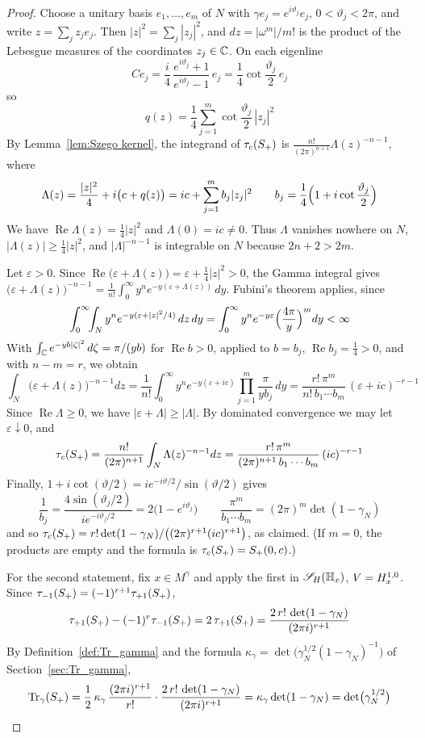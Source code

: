 \documentclass[11pt]{amsart}
\theoremstyle{plain}
\theoremstyle{definition}
\theoremstyle{remark}
\begin{document}
\begin{proof}
Choose a unitary basis $e_1,\dots,e_m$ of $N$ with $\gamma e_j=e^{i\vartheta_j}e_j$, $0<\vartheta_j<2\pi$, and write $z=\sum_j z_je_j$.
Then $|z|^2=\sum_j|z_j|^2$, and $dz=|\omega^m|/m!$ is the product of the Lebesgue measures of the coordinates $z_j\in{\mathbb{C}}$.
On each eigenline
\[ C e_j=\frac{i}{4}\,\frac{e^{i\vartheta_j}+1}{e^{i\vartheta_j}-1}\,e_j=\frac14\cot\frac{\vartheta_j}{2}\,e_j\]
so
\[ q(z)=\frac14\sum_{j=1}^m\cot\frac{\vartheta_j}{2}\,|z_j|^2\]
By Lemma~\ref{lem:Szego kernel}, the integrand of $\tau_{c}(S_+)$ is $\frac{n!}{(2\pi)^{n+1}}\Lambda(z)^{-n-1}$, where
\[ \Lambda(z)=\frac{|z|^2}{4}+i\bigl(c+q(z)\bigr)=ic+\sum_{j=1}^mb_j|z_j|^2\qquad b_j=\frac14\Bigl(1+i\cot\frac{\vartheta_j}{2}\Bigr)\]
We have $\operatorname{Re}\Lambda(z)=\frac14|z|^2$ and $\Lambda(0)=ic\ne0$.
Thus $\Lambda$ vanishes nowhere on $N$, $|\Lambda(z)|\ge\frac14|z|^2$, and $|\Lambda|^{-n-1}$ is integrable on $N$ because $2n+2>2m$.

Let $\varepsilon>0$.
Since $\operatorname{Re}\bigl(\varepsilon+\Lambda(z)\bigr)=\varepsilon+\frac14|z|^2>0$, the Gamma integral gives $\bigl(\varepsilon+\Lambda(z)\bigr)^{-n-1}=\frac1{n!}\int_0^\infty y^ne^{-y(\varepsilon+\Lambda(z))}\,dy$.
Fubini's theorem applies, since
\[ \int_0^\infty\!\!\int_Ny^ne^{-y(\varepsilon+|z|^2/4)}\,dz\,dy=\int_0^\infty y^ne^{-y\varepsilon}\Bigl(\frac{4\pi}{y}\Bigr)^m dy<\infty\]
With $\int_{\mathbb{C}} e^{-yb|\zeta|^2}\,d\zeta=\pi/(yb)$ for $\operatorname{Re}b>0$, applied to $b=b_j$, $\operatorname{Re}b_j=\frac14>0$, and with $n-m=r$, we obtain
\[ \int_N\bigl(\varepsilon+\Lambda(z)\bigr)^{-n-1}dz=\frac{1}{n!}\int_0^\infty y^ne^{-y(\varepsilon+ic)}\prod_{j=1}^m\frac{\pi}{y b_j}\,dy=\frac{r!\,\pi^m}{n!\,b_1\cdots b_m}\,(\varepsilon+ic)^{-r-1}\]
Since $\operatorname{Re}\Lambda\ge0$, we have $|\varepsilon+\Lambda|\ge|\Lambda|$.
By dominated convergence we may let $\varepsilon\downarrow0$, and
\[ \tau_{c}(S_+)=\frac{n!}{(2\pi)^{n+1}}\int_N\Lambda(z)^{-n-1}dz=\frac{r!\,\pi^m}{(2\pi)^{n+1}\,b_1\cdots b_m}\,(ic)^{-r-1}\]
Finally, $1+i\cot(\vartheta/2)=ie^{-i\vartheta/2}/\sin(\vartheta/2)$ gives
\[ \frac{1}{b_j}=\frac{4\sin(\vartheta_j/2)}{ie^{-i\vartheta_j/2}}=2\bigl(1-e^{i\vartheta_j}\bigr)\qquad \frac{\pi^m}{b_1\cdots b_m}=(2\pi)^m\det(1-\gamma_N)\]
and so $\tau_{c}(S_+)=r!\det(1-\gamma_N)/\bigl((2\pi)^{r+1}(ic)^{r+1}\bigr)$, as claimed.
(If $m=0$, the products are empty and the formula is $\tau_{c}(S_+)=S_+(0,c)$.)

For the second statement, fix $x\in M^\gamma$ and apply the first in ${\mathscr{S}_H}(\mathbb{H}_x)$, $V=H^{1,0}_x$.
Since $\tau_{-1}(S_+)=(-1)^{r+1}\tau_{+1}(S_+)$,
\[ \tau_{+1}(S_+)-(-1)^r\tau_{-1}(S_+)=2\,\tau_{+1}(S_+)=\frac{2\,r!\,\det(1-\gamma_N)}{(2\pi i)^{r+1}}\]
By Definition~\ref{def:Tr_gamma} and the formula $\kappa_\gamma=\det\bigl(\gamma_N^{1/2}(1-\gamma_N)^{-1}\bigr)$ of Section~\ref{sec:Tr_gamma},
\[ \operatorname{Tr}_\gamma(S_+)=\frac12\,\kappa_\gamma\,\frac{(2\pi i)^{r+1}}{r!}\cdot\frac{2\,r!\,\det(1-\gamma_N)}{(2\pi i)^{r+1}}=\kappa_\gamma\det(1-\gamma_N)=\det\bigl(\gamma_N^{1/2}\bigr)\]
\end{proof}
\end{document}
